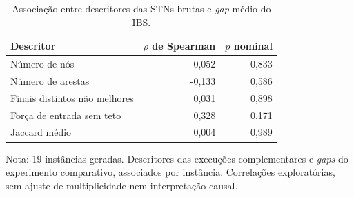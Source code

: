 \begin{table}[!htbp]
\centering
\caption{Associação entre descritores das STNs brutas e \textit{gap} médio do IBS.}
\label{tab:res-correlacoes}
\begin{singlespace}
\normalsize
\setlength{\tabcolsep}{5pt}
\renewcommand{\arraystretch}{1.15}
\begin{tabular}{lrr}
\hline\hline
\textbf{Descritor} & \textbf{$\rho$ de Spearman} & \textbf{$p$ nominal} \\
\hline
Número de nós & 0,052 & 0,833 \\
Número de arestas & -0,133 & 0,586 \\
Finais distintos não melhores & 0,031 & 0,898 \\
Força de entrada sem teto & 0,328 & 0,171 \\
Jaccard médio & 0,004 & 0,989 \\
\hline\hline
\end{tabular}
\par\smallskip
{\small Nota: 19 instâncias geradas. Descritores das execuções complementares e \textit{gaps} do experimento comparativo, associados por instância. Correlações exploratórias, sem ajuste de multiplicidade nem interpretação causal.\par}
{}
\end{singlespace}
\end{table}

